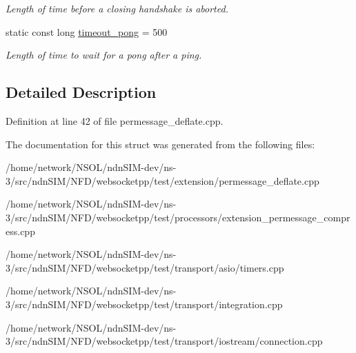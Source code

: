 \begin{DoxyCompactItemize}
\begin{DoxyCompactList}\small\item\em Length of time before a closing handshake is aborted. \end{DoxyCompactList}\item 
static const long \hyperlink{classconfig_a4e28a7b5922f4a8b15c83ff7196bce28}{timeout\+\_\+pong} = 500\hypertarget{classconfig_a4e28a7b5922f4a8b15c83ff7196bce28}{}\label{classconfig_a4e28a7b5922f4a8b15c83ff7196bce28}

\begin{DoxyCompactList}\small\item\em Length of time to wait for a pong after a ping. \end{DoxyCompactList}\end{DoxyCompactItemize}


\subsection{Detailed Description}


Definition at line 42 of file permessage\+\_\+deflate.\+cpp.



The documentation for this struct was generated from the following files\+:\begin{DoxyCompactItemize}
\item 
/home/network/\+N\+S\+O\+L/ndn\+S\+I\+M-\/dev/ns-\/3/src/ndn\+S\+I\+M/\+N\+F\+D/websocketpp/test/extension/permessage\+\_\+deflate.\+cpp\item 
/home/network/\+N\+S\+O\+L/ndn\+S\+I\+M-\/dev/ns-\/3/src/ndn\+S\+I\+M/\+N\+F\+D/websocketpp/test/processors/extension\+\_\+permessage\+\_\+compress.\+cpp\item 
/home/network/\+N\+S\+O\+L/ndn\+S\+I\+M-\/dev/ns-\/3/src/ndn\+S\+I\+M/\+N\+F\+D/websocketpp/test/transport/asio/timers.\+cpp\item 
/home/network/\+N\+S\+O\+L/ndn\+S\+I\+M-\/dev/ns-\/3/src/ndn\+S\+I\+M/\+N\+F\+D/websocketpp/test/transport/integration.\+cpp\item 
/home/network/\+N\+S\+O\+L/ndn\+S\+I\+M-\/dev/ns-\/3/src/ndn\+S\+I\+M/\+N\+F\+D/websocketpp/test/transport/iostream/connection.\+cpp\end{DoxyCompactItemize}
